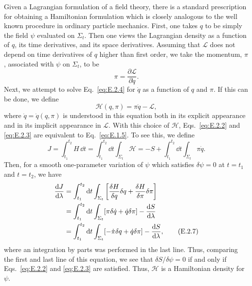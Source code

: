 Given a Lagrangian formulation of a field theory, there is a standard prescription
for obtaining a Hamiltonian formulation which is closely analogous to the well
known procedure in ordinary particle mechanics. First, one takes \(q\) to be simply
the field \(\psi\) evaluated on \(\Sigma_t\). Then one views the Lagrangian density
as a function of \(q\), its time derivatives, and its space derivatives. Assuming that
\(\mathcal L\) does not depend on time derivatives of \(q\) higher than first order,
we take the momentum, \(\pi\), associated with \(\psi\) on \(\Sigma_t\), to be
\begin{equation}
  \pi=\frac{\partial\mathcal L}{\partial\dot q}.
  \tag{E.2.4}\label{eq:E.2.4}
\end{equation}
Next, we attempt to solve Eq.~\eqref{eq:E.2.4} for \(\dot q\) as a function of
\(q\) and \(\pi\). If this can be done, we define
\begin{equation}
  \mathcal H(q,\pi)=\pi\dot q-\mathcal L,
  \tag{E.2.5}\label{eq:E.2.5}
\end{equation}
where \(\dot q=\dot q(q,\pi)\) is understood in this equation both in its explicit
appearance and in its implicit appearance in \(\mathcal L\). With this choice of
\(\mathcal H\), Eqs.~\eqref{eq:E.2.2} and \eqref{eq:E.2.3} are equivalent to
Eq.~\eqref{eq:E.1.5}. To see this, we define
\begin{equation}
  J=\int_{t_1}^{t_2}H\,\dd t
    =\int_{t_1}^{t_2}\dd t\int_{\Sigma_t}\mathcal H
    =-S+\int_{t_1}^{t_2}\dd t\int_{\Sigma_t}\pi\dot q .
  \tag{E.2.6}\label{eq:E.2.6}
\end{equation}
Then, for a smooth one-parameter variation of \(\psi\) which satisfies
\(\delta\psi=0\) at \(t=t_1\) and \(t=t_2\), we have
\begin{align}
  \frac{\dd J}{\dd\lambda}
    &=\int_{t_1}^{t_2}\dd t\int_{\Sigma_t}
      \left[\frac{\delta H}{\delta q}\delta q
        +\frac{\delta H}{\delta\pi}\delta\pi\right]\notag\\
    &=\int_{t_1}^{t_2}\dd t\int_{\Sigma_t}
      [\pi\delta\dot q+\dot q\delta\pi]-\frac{\dd S}{\dd\lambda}\notag\\
    &=\int_{t_1}^{t_2}\dd t\int_{\Sigma_t}
      [-\dot\pi\delta q+\dot q\delta\pi]-\frac{\dd S}{\dd\lambda},
  \tag{E.2.7}\label{eq:E.2.7}
\end{align}
where an integration by parts was performed in the last line. Thus, comparing the
first and last line of this equation, we see that \(\delta S/\delta\psi=0\) if and
only if Eqs.~\eqref{eq:E.2.2} and \eqref{eq:E.2.3} are satisfied. Thus,
\(\mathcal H\) is a Hamiltonian density for \(\psi\).

